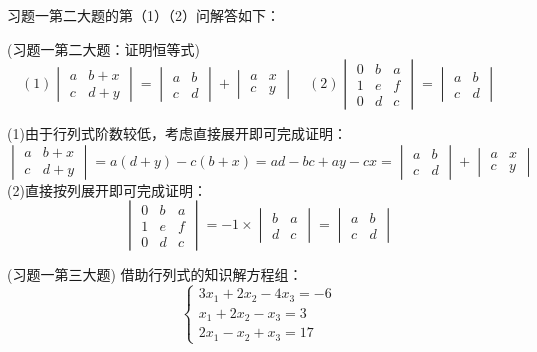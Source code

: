习题一第二大题的第（1）（2）问解答如下：
\begin{example}{(习题一第二大题：证明恒等式)}{}
    \[
    (1)\begin{vmatrix}
        a&b+x\\
        c&d+y
    \end{vmatrix}=\begin{vmatrix}
        a&b\\
        c&d
    \end{vmatrix}+\begin{vmatrix}
        a&x\\
        c&y
    \end{vmatrix}\quad
    (2)\begin{vmatrix}
        0&b&a\\
        1&e&f\\
        0&d&c\end{vmatrix}=\begin{vmatrix}
        a&b\\
        c&d\end{vmatrix}\]
\end{example}
\begin{solution}{}{}
    (1)由于行列式阶数较低，考虑直接展开即可完成证明：\[\begin{vmatrix}
        a&b+x\\
        c&d+y
    \end{vmatrix}=a(d+y)-c(b+x)=ad-bc+ay-cx=\begin{vmatrix}
        a&b\\
        c&d
    \end{vmatrix}+\begin{vmatrix}
        a&x\\
        c&y\end{vmatrix}\]
    (2)直接按列展开即可完成证明：\[\begin{vmatrix}
        0&b&a\\
        1&e&f\\
        0&d&c\end{vmatrix}=-1\times\begin{vmatrix}
        b&a\\
        d&c\end{vmatrix}=\begin{vmatrix}
            a&b\\
            c&d\end{vmatrix}\]
\end{solution}
\begin{example}{(习题一第三大题)}{}
    借助行列式的知识解方程组：\[
    \begin{cases}
        3x_1+2x_2-4x_3=-6\\
        x_1+2x_2-x_3=3\\
        2x_1-x_2+x_3=17\end{cases}\]
\end{example}

